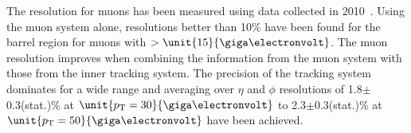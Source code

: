 The \pt resolution for muons has been measured using data collected in 2010~\cite{MUO-10-004}. Using the muon system alone, resolutions better than 10\% have been found for the barrel region for muons with \pt $> \unit{15}{\giga\electronvolt}$. The muon resolution improves when combining the information from the muon system with those from the inner tracking system. The precision of the tracking system dominates for a wide \pt range and averaging over $\eta$ and $\phi$ resolutions of 1.8$\pm$0.3(stat.)\% at $\unit{\pt = 30}{\giga\electronvolt}$ to 2.3$\pm$0.3(stat.)\% at $\unit{\pt = 50}{\giga\electronvolt}$ have been achieved.
